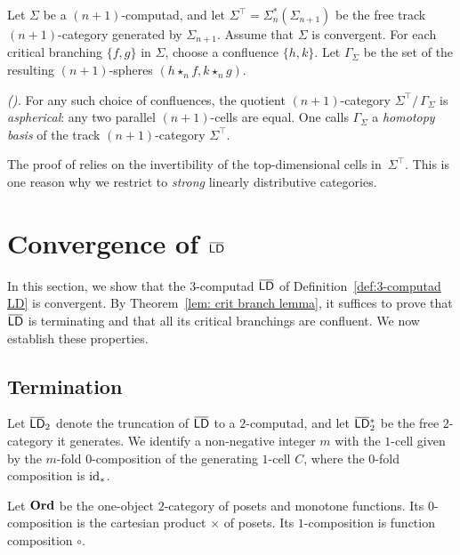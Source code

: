 \documentclass[reqno,12pt]{amsart}
\begin{document}
Let $\Sigma$ be a $(n+1)$-computad, and let $\Sigma^\top=\Sigma_n^{\ast}(\Sigma_{n+1})$ be the free track {$(n+1)$-category} generated by $\Sigma_{n+1}$. Assume that $\Sigma$ is convergent. For each critical branching $\{f,g\}$ in $\Sigma$, choose a confluence $\{h,k\}$. Let $\Gamma_\Sigma$ be the set of the resulting $(n+1)$-spheres $(h\star_n f,k\star_n g)$.
\begin{proposition}\emph{(\cite[Prop. 4.3.4]{GuMa}).}\label{prop: homotop basis free track}
	For any such choice of confluences, the quotient $(n+1)$-category $\Sigma^\top/\,\Gamma_\Sigma$ is \emph{aspherical}: any two parallel $(n+1)$-cells are equal. One calls $\Gamma_\Sigma$ a \emph{homotopy basis} of the track $(n+1)$-category $\Sigma^\top$.
\end{proposition}
 The proof of \cite[Prop. 4.3.4]{GuMa} relies on the invertibility of the top-dimensional cells in~$\Sigma^\top$. This is one reason why we restrict to \emph{strong} linearly distributive categories.

\section{Convergence of \texorpdfstring{$\highoverline{\ms{LD}}$}{LD}}\label{sec: convergence of compl}

In this section, we show that the $3$-computad 
$\oLD$ of Definition~\ref{def:3-computad LD} is convergent. By Theorem~\ref{lem: crit branch lemma}, it suffices to prove that $\oLD$ is terminating and that all its critical branchings are confluent. We now establish these properties.

\subsection{Termination}\label{subs:termination}
Let \(\oLD_{2}\) denote the truncation of \(\oLD\) to a \(2\)-computad, and let \(\oLD_{2}^{\ast}\) be the free \(2\)-category it generates. We identify a non-negative integer $m$ with the $1$-cell given by the $m$-fold \(0\)-composition of the generating $1$-cell \(C\), where the $0$-fold composition is \({\operatorname{id}}_{\ast}\).

Let \(\mathbf{Ord}\) be the one-object \(2\)-category of posets and monotone functions. Its \(0\)-composition is the cartesian product \(\times\) of posets. Its \(1\)-composition is function composition \(\circ\).
\end{document}
